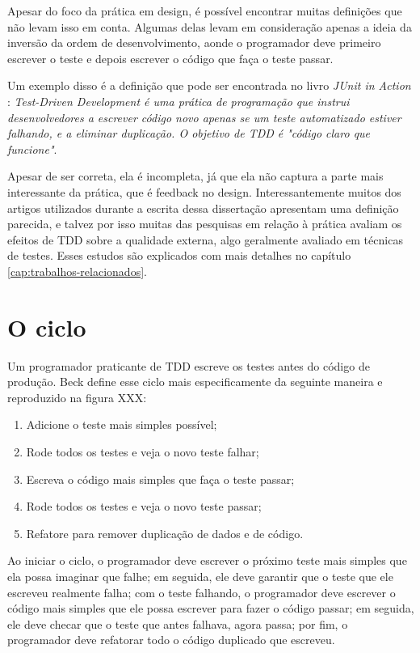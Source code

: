 Apesar do foco da prática em design, é possível encontrar muitas definições que
não levam isso em conta. Algumas delas levam em consideração apenas a ideia da
inversão da ordem de desenvolvimento, aonde o programador deve primeiro escrever
o teste e depois escrever o código que faça o teste passar.

Um exemplo disso é a definição que pode ser encontrada no livro \textit{JUnit
in Action} \cite{junit-in-action}: \textit{Test-Driven Development é uma
prática de programação que instrui desenvolvedores a escrever código novo
apenas se um teste automatizado estiver falhando, e a eliminar duplicação. O
objetivo de TDD é "código claro que funcione"}.

Apesar de ser correta, ela é incompleta, já que ela não captura a parte mais
interessante da prática, que é feedback no design. Interessantemente muitos
dos artigos utilizados durante a escrita dessa dissertação apresentam uma
definição parecida, e talvez por isso muitas das pesquisas em relação à prática
avaliam os efeitos de TDD sobre a qualidade externa, algo geralmente avaliado em
técnicas de testes. Esses estudos são explicados com mais detalhes no capítulo
\ref{cap:trabalhos-relacionados}.

\section{O ciclo}

Um programador praticante de TDD escreve os testes antes do código de produção.
Beck define esse ciclo mais especificamente da seguinte maneira
\cite{TDDByExample} e reproduzido na figura XXX:

\begin{enumerate}
	\item Adicione o teste mais simples possível; 
	\item Rode todos os testes e veja o novo teste falhar; 
	\item Escreva o código mais simples que faça o teste passar; 
	\item Rode todos os testes e veja o novo teste passar; 
	\item Refatore para remover duplicação de dados e de código.
\end{enumerate}

Ao iniciar o ciclo, o programador deve escrever o próximo teste mais simples que
ela possa imaginar que falhe; em seguida, ele deve garantir que o teste que ele
escreveu realmente falha; com o teste falhando, o programador deve escrever o
código mais simples que ele possa escrever para fazer o código passar; em
seguida, ele deve checar que o teste que antes falhava, agora passa; por fim, o
programador deve refatorar todo o código duplicado que escreveu.


